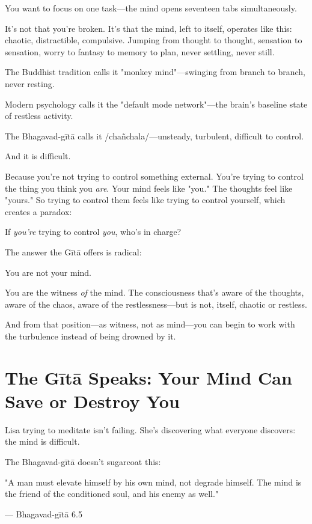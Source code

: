\documentclass[11pt,twoside]{book}
\begin{document}
You want to focus on one task—the mind opens seventeen tabs simultaneously.

It's not that you're broken. It's that the mind, left to itself, operates like this: chaotic, distractible, compulsive. Jumping from thought to thought, sensation to sensation, worry to fantasy to memory to plan, never settling, never still.

The Buddhist tradition calls it "monkey mind"—swinging from branch to branch, never resting.

Modern psychology calls it the "default mode network"—the brain's baseline state of restless activity.

The Bhagavad-gītā calls it /chañchala/—unsteady, turbulent, difficult to control.

And it is difficult.

Because you're not trying to control something external. You're trying to control the thing you think you \emph{are}. Your mind feels like "you." The thoughts feel like "yours." So trying to control them feels like trying to control yourself, which creates a paradox:

If \emph{you're} trying to control \emph{you}, who's in charge?

The answer the Gītā offers is radical:

You are not your mind.

You are the witness \emph{of} the mind. The consciousness that's aware of the thoughts, aware of the chaos, aware of the restlessness—but is not, itself, chaotic or restless.

And from that position—as witness, not as mind—you can begin to work with the turbulence instead of being drowned by it.

\section*{The Gītā Speaks: Your Mind Can Save or Destroy You}

Lisa trying to meditate isn't failing. She's discovering what everyone discovers: the mind is difficult.

The Bhagavad-gītā doesn't sugarcoat this:

\begin{pullquote}
"A man must elevate himself by his own mind, not degrade himself. The mind is the friend of the conditioned soul, and his enemy as well."

--- Bhagavad-gītā 6.5
\end{pullquote}
\end{document}
